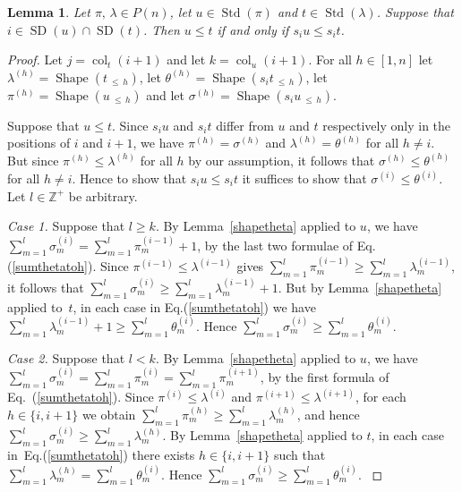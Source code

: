 \documentclass[10pt]{amsart}
\newtheorem{lemm}[theo]{Lemma}
\theoremstyle{definition}
\newenvironment{Case}[1]{\smallskip\noindent\emph{Case #1}\endgraf
 \nobreak\noindent\ignorespaces}{\endgraf\smallskip}
\DeclareMathOperator{\col}{col}
\newcommand{\Lessthan}[2]{#1\,{_{\leqslant\,#2}}}
\DeclareMathOperator{\STD}{Std}
\DeclareMathOperator{\shape}{Shape}
\DeclareMathOperator{\SD}{SD}
\begin{document}
\begin{lemm}\label{characterisationofdominanceorderontab}
Let $\pi,\,\lambda\in P(n)$, let $u\in\STD(\pi)$ and
$t\in\STD(\lambda)$. Suppose that $i\in\SD(u)\cap\SD(t)$. Then
$u \leqslant t$ if and only if $s_{i}u \leqslant s_{i}t$.
\end{lemm}

\begin{proof}
Let $j=\col_t(i+1)$ and let $k=\col_u(i+1)$.
For all $h\in[1,n]$ let $\lambda^{(h)} = \shape(\Lessthan th)$, let
$\theta^{(h)} = \shape(\Lessthan{s_{i}t}h)$,
let $\pi^{(h)} = \shape(\Lessthan uh)$ and let
 $\sigma^{(h)} = \shape(\Lessthan{s_{i}u}h)$.

Suppose that $u\leqslant t$. Since $s_iu$ and $s_it$ differ from
$u$ and $t$ respectively only in the positions of $i$ and $i+1$, we have
$\pi^{(h)}=\sigma^{(h)}$ and $\lambda^{(h)}=\theta^{(h)}$ for all $h\neq i$.
But since $\pi^{(h)}\leqslant\lambda^{(h)}$ for all $h$ by our assumption,
it follows that $\sigma^{(h)}\leqslant\theta^{(h)}$ for all $h\neq i$.
Hence to show that $s_iu\leqslant s_it$ it suffices to show that
$\sigma^{(i)}\leqslant\theta^{(i)}$.
Let $l\in\mathbb{Z}^+$ be arbitrary.

\begin{Case}{1.}
Suppose that $l\geqslant k$. By Lemma~\ref{shapetheta} applied to $u$,
we have $\sum_{m=1}^l \sigma^{(i)}_m = \sum_{m=1}^l \pi^{(i-1)}_m + 1$,
by the last two formulae of Eq.(\ref{sumthetatoh}).
Since $\pi^{(i-1)}\leqslant\lambda^{(i-1)}$ gives
$\sum_{m=1}^l \pi^{(i-1)}_m \geqslant \sum_{m=1}^l \lambda^{(i-1)}_m$,
it follows that
$\sum_{m=1}^l \sigma^{(i)}_m \geqslant \sum_{m=1}^l \lambda^{(i-1)}_m + 1$.
But by Lemma~\ref{shapetheta} applied to~$t$, in each case
in Eq.(\ref{sumthetatoh}) we have
$\sum_{m=1}^l \lambda^{(i-1)}_m + 1 \geqslant \sum_{m=1}^l \theta^{(i)}_m$.
Hence $\sum_{m=1}^l \sigma^{(i)}_m \geqslant \sum_{m=1}^l \theta^{(i)}_m$.
\end{Case}

\begin{Case}{2.}
Suppose that $l<k$. By Lemma~\ref{shapetheta} applied to $u$, we have
$\sum_{m=1}^l \sigma^{(i)}_m = \sum_{m=1}^l \pi^{(i)}_m
= \sum_{m=1}^l \pi^{(i+1)}_m\!$, by the first formula of Eq.~(\ref{sumthetatoh}).
Since $\pi^{(i)}\leqslant\lambda^{(i)}$
and $\pi^{(i+1)}\leqslant\lambda^{(i+1)}$, for each $h\in\{i,i+1\}$
we obtain
$\sum_{m=1}^l \pi^{(h)}_m \geqslant \sum_{m=1}^l \lambda^{(h)}_m$,
and hence $\sum_{m=1}^l \sigma^{(i)}_m\geqslant \sum_{m=1}^l \lambda^{(h)}_m$.
By Lemma~\ref{shapetheta} applied to $t$,
in each case in~Eq.(\ref{sumthetatoh}) there exists $h\in\{i,i+1\}$
such that $\sum_{m=1}^l \lambda^{(h)}_m = \sum_{m=1}^l \theta^{(i)}_m$.
Hence $\sum_{m=1}^l \sigma^{(i)}_m \geqslant \sum_{m=1}^l \theta^{(i)}_m$.
\end{Case}


\end{proof}
\end{document}
